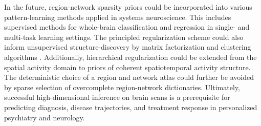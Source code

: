 \documentclass[runningheads,a4paper]{llncs}
\begin{document}
In the future,
region-network sparsity priors could be incorporated into various
pattern-learning methods applied in systems neuroscience.
%
This includes supervised methods for whole-brain classification and regression
in single- and multi-task learning settings.
The principled regularization scheme could also inform
unsupervised structure-discovery by
matrix factorization and clustering algorithms
\cite{jenatton2009structured}.
Additionally,
hierarchical regularization could be extended
from the spatial activity domain to
priors of coherent spatiotemporal activity structure.
%
The deterministic choice of a region and network atlas
could further be avoided by
sparse selection of overcomplete region-network dictionaries.
%
Ultimately,
successful high-dimensional inference on brain scans is
a prerequisite
for predicting diagnosis,
disease trajectories, and treatment response
in personalized psychiatry and neurology.
\nopagebreak
\small

% 

\end{document}
